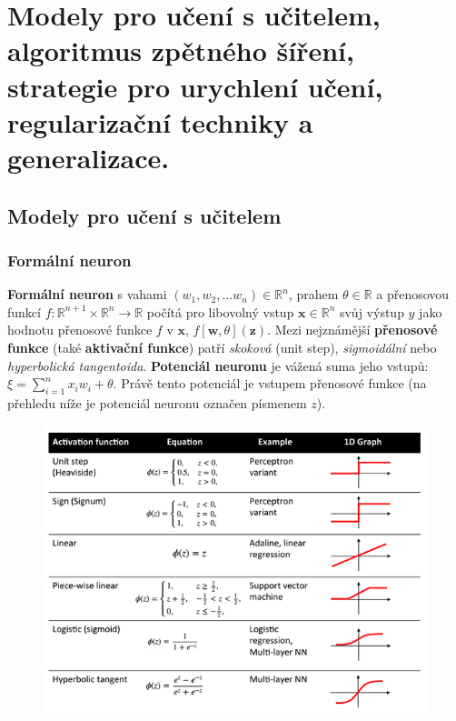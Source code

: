 \documentclass[11pt]{report} %
\newcommand{\R}{\mathbb{R}}
\renewcommand{\vec}[1]{\mathbf{#1}}
\numberwithin{equation}{section}
\begin{document}
\section{Modely pro učení s učitelem, algoritmus zpětného šíření, strategie pro urychlení učení, regularizační techniky a generalizace.}

\subsection{Modely pro učení s učitelem}
\subsubsection{Formální neuron}
\textbf{Formální neuron} s vahami $(w_1, w_2, \dots w_n) \in \R^n$, prahem $\theta \in \R$ a přenosovou funkcí $f : \R^{n+1} \times \R^n \rightarrow \R$ počítá pro libovolný vstup $\vec{x} \in \R^n$ svůj výstup $y$ jako hodnotu přenosové funkce $f$ v $\vec{x}$, $f[\vec{w}, \theta](\vec{z})$. Mezi nejznámější \textbf{přenosové funkce} (také \textbf{aktivační funkce}) patří \textit{skoková} (unit step), \textit{sigmoidální} nebo \textit{hyperbolická tangentoida}. \textbf{Potenciál neuronu} je vážená suma jeho vstupů: $\xi = \sum\limits_{i=1}^n x_i w_i + \theta$. Právě tento potenciál je vstupem přenosové funkce (na přehledu níže je potenciál neuronu označen písmenem $z$).

\begin{figure}[H]
	\centering
	\includegraphics[scale=0.7]{img/activation_functions.png}
\end{figure}
\end{document}
